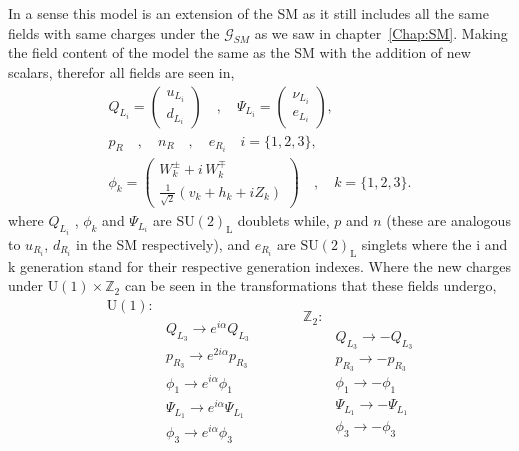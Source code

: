 In a sense this model is an extension of the SM as it still includes all the same fields with same charges under the $\mathcal{G}_{SM}$ as we saw in chapter~\ref{Chap:SM}. 
% 
Making the field content of the model the same as the SM with the addition of new scalars, therefor all fields are seen in,
%
%
\begin{equation}
\label{eq:3HDM_Fields}
\begin{gathered}
Q_{L_i} =  \begin{pmatrix}
u_{L_i}  \\
d_{L_i}
\end{pmatrix} \quad , \quad \Psi_{L_i} =  \begin{pmatrix}
\nu_{L_i}  \\
e_{L_i}
\end{pmatrix}  ,  \\ 
p_R \quad , \quad n_R \quad , \quad e_{R_i} \quad i=\{1,2,3\}  ,  \\  
\phi_k = \begin{pmatrix}
W_k^\pm + i \, W_k^\mp \\ 
\frac{1}{\sqrt{2}}\left( v_k + h_k + i Z_k \right) 
\end{pmatrix}  \quad , \quad k=\{ 1,2,3\}  . 
\end{gathered} 
\end{equation}
%
where $Q_{L_i}$ , $\phi_k$ and $\Psi_{L_i}$ are $\mathrm{SU(2)_L}$ doublets while, $p$ and $n$ (these are analogous to $u_{R_i}$, $d_{R_i}$ in the SM respectively), and $e_{R_i}$ are $\mathrm{SU(2)_L}$ singlets where the i and k generation stand for their respective generation indexes. 
%
Where the new charges under $\mathrm{U(1)}\times\mathbb{Z}_2$ can be seen in the transformations that these fields undergo, 
%
\begin{equation}
\label{eq:3HDM_Transformations}
	\begin{split} 
	\mathrm{U(1)} : & \\
		& Q_{L_3} \rightarrow    e^{i \alpha} Q_{L_3}  \\  
		& p_{R_3} \rightarrow    e^{2 i \alpha} p_{R_3}  \\
		& \phi_1  \rightarrow    e^{i \alpha} \phi_1  \\   
		& \Psi_{L_1} \rightarrow e^{i \alpha} \Psi_{L_1} \\
		& \phi_3 \rightarrow     e^{i \alpha} \phi_3  \\ 
	\end{split} \quad \quad \quad  
	\begin{split}
		\mathbb{Z}_2 : & \\
		 	& Q_{L_3} \rightarrow -Q_{L_3} \\
		 	& p_{R_3} \rightarrow -p_{R_3} \\ 
		 	& \phi_1  \rightarrow -\phi_1 \\ 
		 	& \Psi_{L_1} \rightarrow - \Psi_{L_1} \\ 
		 	& \phi_3 \rightarrow -\phi_3
	\end{split}  
\end{equation} 
